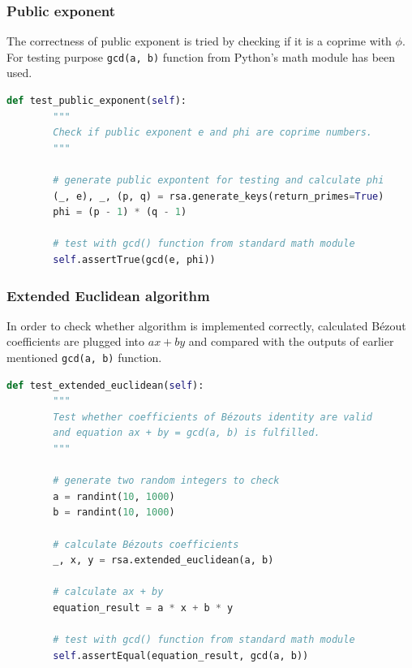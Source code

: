 \documentclass{article}
\begin{document}
\normalsize

\subsubsection{Public exponent}
The correctness of public exponent is tried by checking if it is a coprime with $\phi$.
For testing purpose \texttt{gcd(a, b)} function from Python's math module has been used.

\small

\begin{lstlisting}[language=Python]
    def test_public_exponent(self):
        """
        Check if public exponent e and phi are coprime numbers.
        """

        # generate public expontent for testing and calculate phi
        (_, e), _, (p, q) = rsa.generate_keys(return_primes=True)
        phi = (p - 1) * (q - 1)

        # test with gcd() function from standard math module
        self.assertTrue(gcd(e, phi))
\end{lstlisting}

\normalsize

\subsubsection{Extended Euclidean algorithm}
In order to check whether algorithm is implemented correctly, calculated Bézout coefficients
are plugged into $ax + by$ and compared with the outputs of earlier mentioned \texttt{gcd(a, b)} function.

\newpage

\small

\begin{lstlisting}[language=Python]
    def test_extended_euclidean(self):
        """
        Test whether coefficients of Bézouts identity are valid
        and equation ax + by = gcd(a, b) is fulfilled.
        """

        # generate two random integers to check
        a = randint(10, 1000)
        b = randint(10, 1000)

        # calculate Bézouts coefficients
        _, x, y = rsa.extended_euclidean(a, b)

        # calculate ax + by
        equation_result = a * x + b * y

        # test with gcd() function from standard math module
        self.assertEqual(equation_result, gcd(a, b))
\end{lstlisting}
\end{document}
